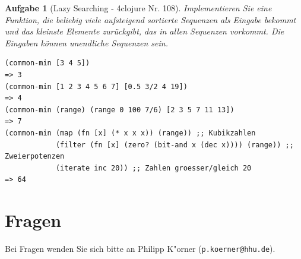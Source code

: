 \documentclass[11pt,a4paper]{article}
\newcounter{numb}
\theoremstyle{break}
\newtheorem{aufgabe}{Aufgabe}[numb]
\begin{document}
\begin{aufgabe}[Lazy Searching - 4clojure Nr. 108]

Implementieren Sie eine Funktion, die beliebig viele aufsteigend sortierte Sequenzen
als Eingabe bekommt und das kleinste Elemente zur\"uckgibt,
das in allen Sequenzen vorkommt.
Die Eingaben k\"onnen unendliche Sequenzen sein.

\begin{verbatim}
(common-min [3 4 5])
=> 3
(common-min [1 2 3 4 5 6 7] [0.5 3/2 4 19])
=> 4
(common-min (range) (range 0 100 7/6) [2 3 5 7 11 13])
=> 7
(common-min (map (fn [x] (* x x x)) (range)) ;; Kubikzahlen
            (filter (fn [x] (zero? (bit-and x (dec x)))) (range)) ;; Zweierpotenzen
            (iterate inc 20)) ;; Zahlen groesser/gleich 20
=> 64
\end{verbatim}

\end{aufgabe}

\section*{Fragen}
Bei Fragen wenden Sie sich bitte an Philipp K"orner (\texttt{p.koerner@hhu.de}).
\end{document}
